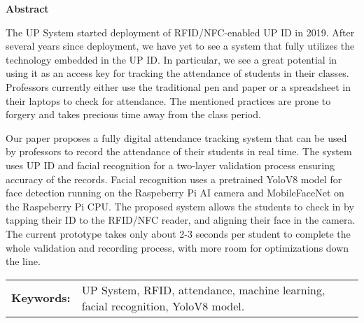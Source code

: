 \begin{center}
\textbf{Abstract}
\end{center}
\setlength{\parindent}{0pt}
The UP System started deployment of RFID/NFC-enabled UP ID in 2019. After several years since deployment, we have yet to see a system that fully utilizes the technology embedded in the UP ID. In particular, we see a great potential in using it as an access key for tracking the attendance of students in their classes. Professors currently either use the traditional pen and paper or a spreadsheet in their laptops to check for attendance. The mentioned practices are prone to forgery and takes precious time away from the class period. 

Our paper proposes a fully digital attendance tracking system that can be used by professors to record the attendance of their students in real time. The system uses UP ID and facial recognition for a two-layer validation process ensuring accuracy of the records. Facial recognition uses a pretrained YoloV8 model for face detection running on the Raspeberry Pi AI camera and MobileFaceNet on the Raspeberry Pi CPU. The proposed system allows the students to check in by tapping their ID to the RFID/NFC reader, and aligning their face in the camera. The current prototype takes only about 2-3 seconds per student to complete the whole validation and recording process, with more room for optimizations down the line.


\begin{tabular}{lp{4.25in}}
\hspace{-0.5em}\textbf{Keywords:}\hspace{0.25em} & UP System, RFID, attendance, machine learning, facial recognition, YoloV8 model.\\
\end{tabular}
